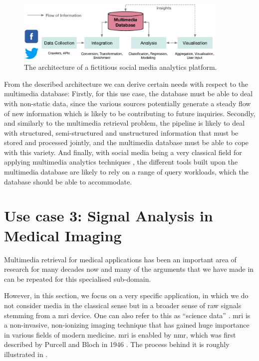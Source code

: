 \begin{figure}[tb]
    \centering
    \includegraphics[width=0.90\textwidth]{figures/social-media-architecture.eps}
    \caption{The architecture of a fictitious social media analytics platform.}
    \label{figure:social-media}
\end{figure}

From the described architecture we can derive certain needs with respect to the multimedia database: Firstly, for this use case, the database must be able to deal with non-static data, since the various sources potentially generate a steady flow of new information which is likely to be contributing to future inquiries. Secondly, and similarly to the multimedia retrieval problem, the pipeline is likely to deal with structured, semi-structured and unstructured information that must be stored and processed jointly, and the multimedia database must be able to cope with this variety. And finally, with social media being a very classical field for applying multimedia analytics techniques \cite{Pouyanfar:2018,Jonsson:2016Ten}, the different tools built upon the multimedia database are likely to rely on a range of query workloads, which the database should be able to accommodate.

\section{Use case 3: Signal Analysis in Medical Imaging}
\label{section:application_mrf}

Multimedia retrieval for medical applications has been an important area of research for many decades now \cite{Mueller:2017Retrieval,Mueller:2004Review} and many of the arguments that we have made in  can be repeated for this specialised sub-domain.

However, in this section, we focus on a very specific application, in which we do not consider media in the classical sense but in a broader sense of raw signals stemming from a \acrfull{mri} device. One can also refer to this as ``science data'' \cite{Stonebraker:2013SciDB}. \acrshort{mri} is a non-invasive, non-ionizing imaging technique that has gained huge importance in various fields of modern medicine. \acrshort{mri} is enabled by \acrfull{nmr}, which was first described by Purcell and Bloch in 1946 \cite{Bloch:1946Nuclear,Purcell:1946Resonance}. The process behind it is roughly illustrated in .

